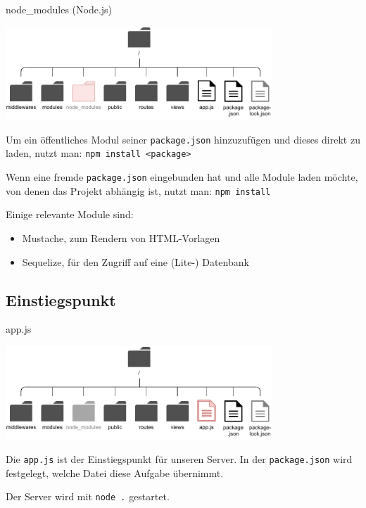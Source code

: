 \begin{bonus}{node\_modules (Node.js)}
    \begin{center}
        \includegraphics[width=0.75\textwidth]{includes/figures/bonus_nodejs_node_modules.pdf}
    \end{center}

    Um ein öffentliches Modul seiner \texttt{package.json} hinzuzufügen und dieses direkt zu laden, nutzt man:
    \texttt{npm install <package>}

    Wenn eine fremde \texttt{package.json} eingebunden hat und alle Module laden möchte, von denen das Projekt abhängig ist, nutzt man:
    \texttt{npm install}

    Einige relevante Module sind:
    \begin{itemize}
        \item Mustache, zum Rendern von HTML-Vorlagen
        \item Sequelize, für den Zugriff auf eine (Lite-) Datenbank
    \end{itemize}
\end{bonus}

\subsection{Einstiegspunkt}

\begin{bonus}{app.js}
    \begin{center}
        \includegraphics[width=0.75\textwidth]{includes/figures/bonus_nodejs_app.pdf}
    \end{center}

    Die \texttt{app.js} ist der Einstiegspunkt für unseren Server.
    In der \texttt{package.json} wird festgelegt, welche Datei diese Aufgabe übernimmt.

    Der Server wird mit \texttt{node .} gestartet.
\end{bonus}

